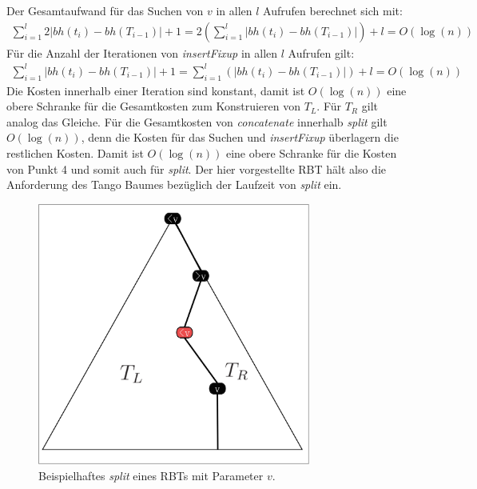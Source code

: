 \documentclass[a4paper,12pt]{article}
\begin{document}
\noindent Der Gesamtaufwand für das Suchen von $v$ in allen $l$ Aufrufen berechnet sich mit: 
\begin{align*}
\sum_{i = 1}^{l}  2 \vert\mathit{bh}(t_{i}) -\mathit{bh}(T_{i-1}) \vert + 1 =
2 \left( \sum_{i = 1}^{l}   \vert\mathit{bh}(t_{i}) -\mathit{bh}(T_{i-1}) \vert \right)+ l
= O \left(\log \left(n \right) \right)
\end{align*}
\noindent Für die Anzahl der Iterationen von \textit{insertFixup} in allen $l$ Aufrufen gilt: 
\begin{align*}
\sum_{i = 1}^{l}   \vert\mathit{bh}(t_{i}) -\mathit{bh}(T_{i-1}) \vert +1 =
\sum_{i = 1}^{l}  \left( \vert\mathit{bh}(t_{i}) -\mathit{bh}(T_{i-1}) \vert \right) + l 
= O \left(\log \left(n \right) \right)
\end{align*}
Die Kosten innerhalb einer Iteration sind konstant, damit ist  $O \left(\log \left(n \right) \right)$ eine obere Schranke für die Gesamtkosten zum Konstruieren von $T_L$. Für $T_R$ gilt analog das Gleiche. Für die Gesamtkosten von \textit{concatenate} innerhalb \textit{split} gilt $O \left(\log \left(n \right) \right)$, denn die Kosten für das Suchen und \textit{insertFixup} überlagern die restlichen Kosten. Damit ist $O \left(\log \left(n \right) \right)$ eine obere Schranke für die Kosten von Punkt 4 und somit auch für \textit{split}. Der hier vorgestellte RBT hält also die Anforderung des Tango Baumes bezüglich der Laufzeit von \textit{split} ein.


\begin{figure}[H]
	\centering
	\includegraphics[width=0.8\textwidth]{Medien/RotSchwarzBaum/aufteilen}
	\caption{Beispielhaftes \textit{split} eines RBTs mit Parameter $v$. }
	\label{fig:aufteilen}
\end{figure}
\end{document}

